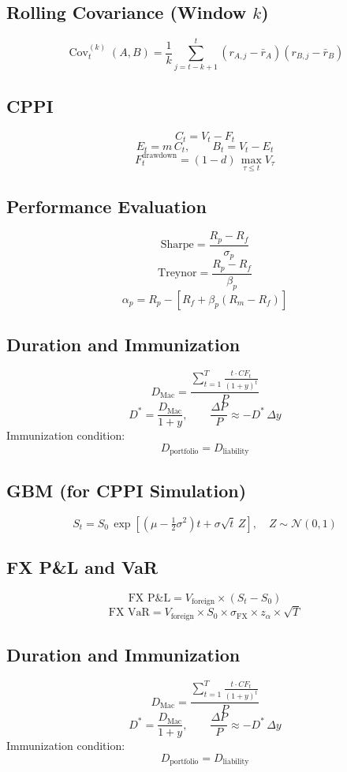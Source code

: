 \documentclass[
]{article}
\begin{document}
\subsection{Rolling Covariance (Window $k$)}
\[
\operatorname{Cov}_{t}^{(k)}(A,B)=
\frac{1}{k}\sum_{j=t-k+1}^{t}
\left(r_{A,j}-\bar r_A\right)
\left(r_{B,j}-\bar r_B\right)
\]

\subsection{CPPI}
\[
C_t = V_t - F_t
\]
\[
E_t = m\,C_t, \qquad B_t = V_t - E_t
\]
\[
F_t^{\text{drawdown}} = (1-d)\,\max_{\tau\le t}V_\tau
\]

\subsection{Performance Evaluation}
\[
\text{Sharpe} = \frac{R_p - R_f}{\sigma_p}
\]
\[
\text{Treynor} = \frac{R_p - R_f}{\beta_p}
\]
\[
\alpha_p = R_p - \left[R_f + \beta_p\left(R_m-R_f\right)\right]
\]

\subsection{Duration and Immunization}
\[
D_{\text{Mac}} = \frac{\displaystyle\sum_{t=1}^{T} \frac{t\cdot CF_t}{(1+y)^t}}{P}
\]
\[
D^* = \frac{D_{\text{Mac}}}{1+y}, \qquad
\frac{\Delta P}{P} \approx -D^*\,\Delta y
\]
Immunization condition:
\[
D_{\text{portfolio}} = D_{\text{liability}}
\]

\subsection{GBM (for CPPI Simulation)}
\[
S_t = S_0\,\exp\!\left[\left(\mu - \tfrac{1}{2}\sigma^2\right)t + \sigma\sqrt{t}\,Z\right],
\quad Z\sim\mathcal{N}(0,1)
\]

\subsection{FX P\&L and VaR}
\[
\text{FX P\&L} = V_{\text{foreign}}\times(S_t - S_0)
\]
\[
\text{FX VaR} = V_{\text{foreign}}\times S_0\times\sigma_{\text{FX}}\times z_\alpha\times\sqrt{T}
\]

\subsection{Duration and Immunization}
\[
D_{\text{Mac}} = \frac{\displaystyle\sum_{t=1}^{T} \frac{t\cdot CF_t}{(1+y)^t}}{P}
\]
\[
D^* = \frac{D_{\text{Mac}}}{1+y}, \qquad
\frac{\Delta P}{P} \approx -D^*\,\Delta y
\]
Immunization condition:
\[
D_{\text{portfolio}} = D_{\text{liability}}
\]
\end{document}
